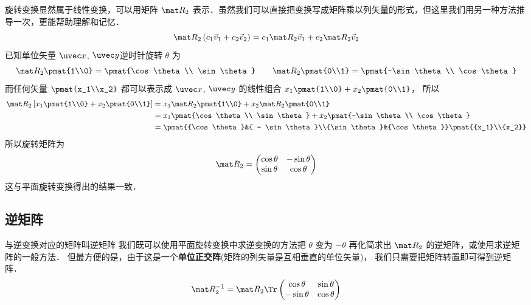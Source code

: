 
旋转变换显然属于线性变换，可以用矩阵 $\mat R_2$ 表示．虽然我们可以直接把变换写成矩阵乘以列矢量的形式，但这里我们用另一种方法推导一次，更能帮助理解和记忆．
\begin{equation}
\mat R_2\left( {{c_1}{{\vec v}_1} + {c_2}{{\vec v}_2}} \right) = {c_1}\mat R_2 {\vec v_1} + {c_2}\mat R_2 {\vec v_2} 
\end{equation}
已知单位矢量 $\uvec x$, $\uvec y$逆时针旋转 $\theta$ 为
\begin{equation}
\mat R_2\pmat{1\\0} = \pmat{\cos \theta \\ \sin \theta}
\qquad
\mat R_2\pmat{0\\1} = \pmat{-\sin\theta \\ \cos\theta}
\end{equation}
而任何矢量 $\pmat{x_1\\x_2}$ 都可以表示成 $\uvec x$, $\uvec y$ 的线性组合 ${x_1}\pmat{1\\0} + {x_2}\pmat{0\\1}$， 所以
\begin{equation}\begin{split}
\mat R_2\left[x_1 \pmat{1\\0} + x_2 \pmat{0\\1} \right] 
&= x_1 \mat R_2\pmat{1\\0} + x_2 \mat R_2\pmat{0\\1}\\
&= x_1\pmat{\cos \theta \\ \sin \theta} 
  + x_2 \pmat{-\sin\theta \\ \cos\theta} \\
&= \pmat{{\cos \theta }&{ - \sin \theta }\\{\sin \theta }&{\cos \theta }}
\pmat{{x_1}\\{x_2}}
\end{split}\end{equation}
所以旋转矩阵为
\begin{equation}
\mat R_2 = \begin{pmatrix}
{\cos\theta }&{ - \sin\theta }\\
{\sin\theta }&{\cos\theta }
\end{pmatrix}
\end{equation}
这与平面旋转变换得出的结果一致．
\subsection{逆矩阵}
与逆变换对应的矩阵叫逆矩阵%
我们既可以使用平面旋转变换中求逆变换的方法把 $\theta$ 变为 $-\theta$ 再化简求出 $\mat R_2$ 的逆矩阵，或使用求逆矩阵的一般方法．%
但最方便的是，由于这是一个\textbf{单位正交阵}(矩阵的列矢量是互相垂直的单位矢量)，%
我们只需要把矩阵转置即可得到逆矩阵．
\begin{equation}
\mat R_2^{-1} = \mat R_2\Tr \begin{pmatrix}
{\cos\theta }&{\sin\theta }\\
{-\sin\theta }&{\cos\theta }
\end{pmatrix}
\end{equation}

